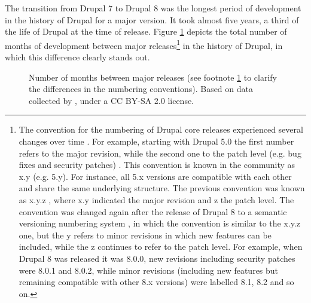 The transition from Drupal 7 to Drupal 8 was the longest period of development in the history of Drupal for a major version. It took almost five years, a third of the life of Drupal at the time of release. Figure \ref{stats-drupal-release} depicts the total number of months of development between major releases\footnote{\label{numbering-conventions}The convention for the numbering of Drupal core releases experienced several changes over time \parencite[e.g][]{drupal-numbering-01:2017:Online, drupal-numbering-02:2017:Online, drupal-numbering-03:2017:Online}. For example, starting with Drupal 5.0 the first number refers to the major revision, while the second one to the patch level (e.g. bug fixes and security patches)  \parencite{ drupal-numbering-02:2017:Online}. This convention is known in the community as x.y (e.g. 5.y). For instance, all 5.x versions are compatible with each other and share the same underlying structure. The previous convention was known as x.y.z \parencite{drupal-numbering-01:2017:Online}, where x.y indicated the major revision and z the patch level. The convention was changed again after the release of Drupal 8 to a semantic versioning numbering system \parencite{ drupal-numbering-04:2017:Online}, in which the convention is similar to the x.y.z one, but the y refers to minor revisions in which new features can be included, while the z continues to refer to the patch level. For example, when Drupal 8 was released it was 8.0.0, new revisions including security patches were 8.0.1 and 8.0.2, while minor revisions (including new features but remaining compatible with other 8.x versions) were labelled 8.1, 8.2 and so on.} in the history of Drupal, in which this difference clearly stands out.

\begin{figure}[H]
\centering
{}
	\caption[Total amount of months between major releases]%
	{Number of months between major releases (see footnote \ref{numbering-conventions} to clarify the differences in the numbering conventions). Based on data collected by \textcite{zoubi-history:2016:Online}, under a CC BY-SA 2.0 license.}
	\label{stats-drupal-release}
\end{figure}

